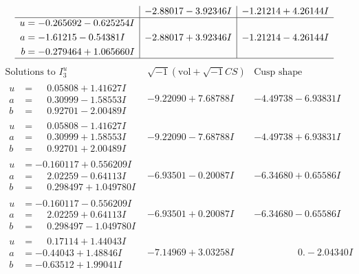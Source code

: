 \documentclass[1p]{elsarticle_modified}
\theoremstyle{definition}
\newcommand{\I}{\sqrt{-1}}
\begin{document}
$$\begin{array}{c|c|c}
 & -2.88017 - 3.92346 I & -1.21214 + 4.26144 I \\ \hline\begin{aligned}
u &= -0.265692 - 0.625254 I \\
a &= -1.61215 - 0.54381 I \\
b &= -0.279464 + 1.065660 I\end{aligned}
 & -2.88017 + 3.92346 I & -1.21214 - 4.26144 I\\
 \hline 
 \end{array}$$\newpage$$\begin{array}{c|c|c}  
\text{Solutions to }I^u_{3}& \I (\text{vol} + \sqrt{-1}CS) & \text{Cusp shape}\\
 \hline 
\begin{aligned}
u &= \phantom{-}0.05808 + 1.41627 I \\
a &= \phantom{-}0.30999 - 1.58553 I \\
b &= \phantom{-}0.92701 - 2.00489 I\end{aligned}
 & -9.22090 + 7.68788 I & -4.49738 - 6.93831 I \\ \hline\begin{aligned}
u &= \phantom{-}0.05808 - 1.41627 I \\
a &= \phantom{-}0.30999 + 1.58553 I \\
b &= \phantom{-}0.92701 + 2.00489 I\end{aligned}
 & -9.22090 - 7.68788 I & -4.49738 + 6.93831 I \\ \hline\begin{aligned}
u &= -0.160117 + 0.556209 I \\
a &= \phantom{-}2.02259 - 0.64113 I \\
b &= \phantom{-}0.298497 + 1.049780 I\end{aligned}
 & -6.93501 - 0.20087 I & -6.34680 + 0.65586 I \\ \hline\begin{aligned}
u &= -0.160117 - 0.556209 I \\
a &= \phantom{-}2.02259 + 0.64113 I \\
b &= \phantom{-}0.298497 - 1.049780 I\end{aligned}
 & -6.93501 + 0.20087 I & -6.34680 - 0.65586 I \\ \hline\begin{aligned}
u &= \phantom{-}0.17114 + 1.44043 I \\
a &= -0.44043 + 1.48846 I \\
b &= -0.63512 + 1.99041 I\end{aligned}
 & -7.14969 + 3.03258 I & \phantom{-0.000000 } 0. - 2.04340 I \\ \hline\begin{aligned}

\end{aligned}
\end{array}$$
\end{document}
